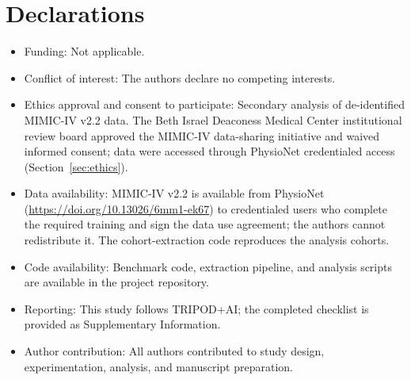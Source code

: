 \documentclass[pdflatex,sn-mathphys-num]{sn-jnl}%
\theoremstyle{thmstyleone}%
\theoremstyle{thmstyletwo}%
\theoremstyle{thmstylethree}%
\begin{document}

\maketitle






\backmatter

\section*{Declarations}
\begin{itemize}
\item Funding: Not applicable.
\item Conflict of interest: The authors declare no competing interests.
\item Ethics approval and consent to participate: Secondary analysis of de-identified MIMIC-IV v2.2 data. The Beth Israel Deaconess Medical Center institutional review board approved the MIMIC-IV data-sharing initiative and waived informed consent; data were accessed through PhysioNet credentialed access (Section~\ref{sec:ethics}).
\item Data availability: MIMIC-IV v2.2 is available from PhysioNet (\url{https://doi.org/10.13026/6mm1-ek67}) to credentialed users who complete the required training and sign the data use agreement; the authors cannot redistribute it. The cohort-extraction code reproduces the analysis cohorts.
\item Code availability: Benchmark code, extraction pipeline, and analysis scripts are available in the project repository.
\item Reporting: This study follows TRIPOD+AI; the completed checklist is provided as Supplementary Information.
\item Author contribution: All authors contributed to study design, experimentation, analysis, and manuscript preparation.
\end{itemize}


\end{document}
